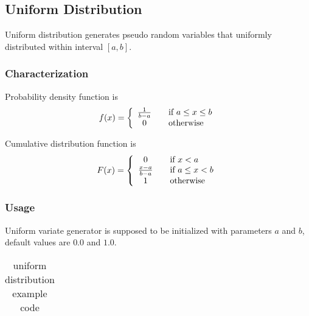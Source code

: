 \subsection{Uniform Distribution} \label{uniformdistribution}

Uniform distribution generates pseudo random variables that uniformly distributed within interval $[a,b]$.

\subsubsection{Characterization}

Probability density function is
\begin{equation}
 f(x) = \left\{
  \begin{array}{c l}
      \frac{1}{b-a} & \quad \text{if $a \leq x \leq b$}\\
    0 & \quad \text{otherwise}
  \end{array} \right.
\end{equation}

Cumulative distribution function is
\begin{equation}
 F(x) = \left\{
  \begin{array}{c l}
      0               & \quad \text{if $x < a$} \\
      \frac{x-a}{b-a} & \quad \text{if $a \leq x < b$}\\
      1               & \quad \text{otherwise}
  \end{array} \right.
\end{equation}


\subsubsection{Usage}

Uniform variate generator is supposed to be initialized with parameters $a$ and $b$, default values are $0.0$ and $1.0$.

\begin{small}
\begin{ttfamily}
\begin{center}
\begin{longtable}{|l|}
\caption{uniform distribution example code} \\
\hline 

\hline
\end{longtable}
\end{center}
\end{ttfamily}
\end{small}


